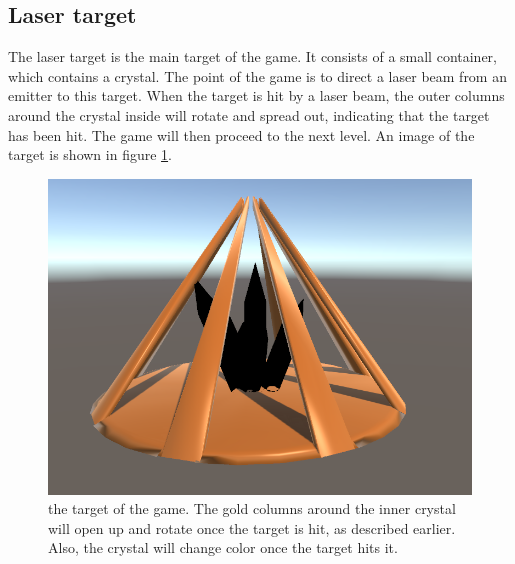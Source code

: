 		\subsection{Laser target} \label{ssec:lasertarget}
			The laser target is the main target of the game. It consists of
			a small container, which contains a crystal. The point of the
			game is to direct a laser beam from an emitter to this target.
			When the target is hit by a laser beam, the outer columns around
			the crystal inside will rotate and spread out, indicating that
			the target has been hit. The game will then proceed to the
			next level. An image of the target is shown in figure 
			\ref{fig:target}.
			\begin{figure}[h!]
				\centering
				\includegraphics[scale = 0.4]{Target}
				\caption{the target of the game. The gold columns around the inner crystal will open up and rotate once the target is hit, as described earlier. Also, the crystal will change color once the target hits it.}
				\label{fig:target}
			\end{figure}
			
